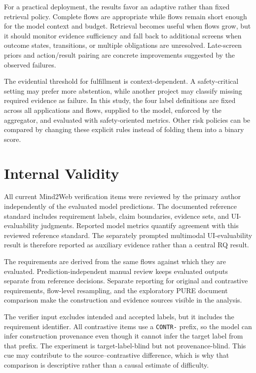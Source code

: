 For a practical deployment, the results favor an adaptive rather than fixed
retrieval policy. Complete flows are appropriate while flows remain short
enough for the model context and budget. Retrieval becomes useful when flows
grow, but it should monitor evidence sufficiency and fall back to additional
screens when outcome states, transitions, or multiple obligations are
unresolved. Late-screen priors and action/result pairing are concrete
improvements suggested by the observed failures.

The evidential threshold for fulfillment is context-dependent. A
safety-critical setting may prefer more abstention, while another project may
classify missing required evidence as failure. In this study, the four label
definitions are fixed across all applications and flows, supplied to the model,
enforced by the aggregator, and evaluated with safety-oriented metrics. Other
risk policies can be compared by changing these explicit rules instead of
folding them into a binary score.

\section{Internal Validity}\label{internal-validity}

All current Mind2Web verification items were reviewed by the primary author
independently of the evaluated model predictions. The documented reference
standard includes requirement labels, claim boundaries, evidence sets, and
UI-evaluability judgments. Reported model metrics quantify agreement with this
reviewed reference standard. The separately prompted multimodal UI-evaluability
result is therefore reported as auxiliary evidence rather than a central RQ
result.

The requirements are derived from the same flows against which they are
evaluated. Prediction-independent manual review keeps evaluated outputs
separate from reference decisions. Separate reporting for original and
contrastive requirements, flow-level resampling, and the exploratory PURE
document comparison make the construction and evidence sources visible in the
analysis.

The verifier input excludes intended and accepted labels, but it includes the
requirement identifier. All contrastive items use a \texttt{CONTR-} prefix, so the
model can infer construction provenance even though it cannot infer the target
label from that prefix. The experiment is target-label-blind but not
provenance-blind. This cue may contribute to the source--contrastive difference,
which is why that comparison is descriptive rather than a causal estimate of
difficulty.

